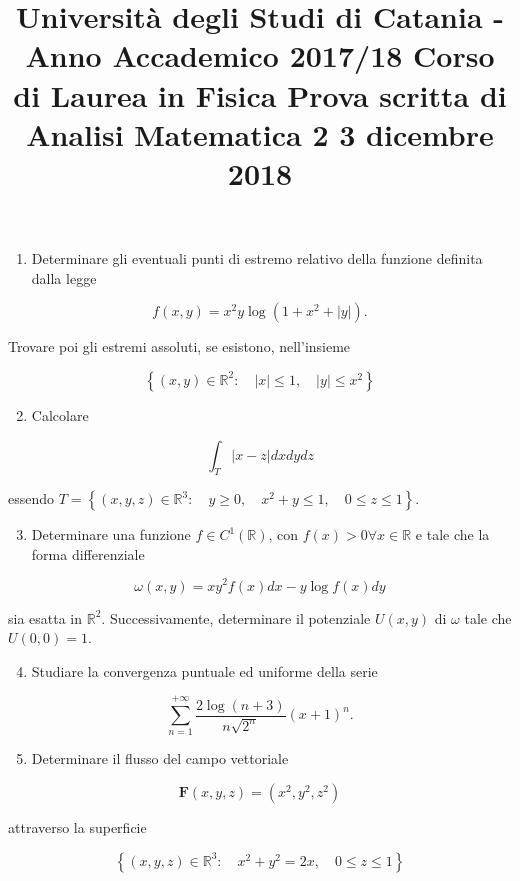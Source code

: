 \documentclass[10pt]{article}
\title{Università degli Studi di Catania - Anno Accademico 2017/18 
 Corso di Laurea in Fisica 
 Prova scritta di Analisi Matematica 2 
 3 dicembre 2018 }
\author{}
\date{}
\begin{document}
\maketitle
\begin{enumerate}
  \item Determinare gli eventuali punti di estremo relativo della funzione definita dalla legge
\end{enumerate}

\[
f(x, y)=x^{2} y \log \left(1+x^{2}+|y|\right) .
\]

Trovare poi gli estremi assoluti, se esistono, nell'insieme

\[
\left\{(x, y) \in \mathbb{R}^{2}: \quad|x| \leq 1, \quad|y| \leq x^{2}\right\}
\]

\begin{enumerate}
  \setcounter{enumi}{1}
  \item Calcolare
\end{enumerate}

\[
\int_{T}|x-z| d x d y d z
\]

essendo \(T=\left\{(x, y, z) \in \mathbb{R}^{3}: \quad y \geq 0, \quad x^{2}+y \leq 1, \quad 0 \leq z \leq 1\right\}\).

\begin{enumerate}
  \setcounter{enumi}{2}
  \item Determinare una funzione \(f \in C^{1}(\mathbb{R})\), con \(f(x)>0 \forall x \in \mathbb{R}\) e tale che la forma differenziale
\end{enumerate}

\[
\omega(x, y)=x y^{2} f(x) d x-y \log f(x) d y
\]

sia esatta in \(\mathbb{R}^{2}\). Successivamente, determinare il potenziale \(U(x, y)\) di \(\omega\) tale che \(U(0,0)=1\).

\begin{enumerate}
  \setcounter{enumi}{3}
  \item Studiare la convergenza puntuale ed uniforme della serie
\end{enumerate}

\[
\sum_{n=1}^{+\infty} \frac{2 \log (n+3)}{n \sqrt{2^{n}}}(x+1)^{n} .
\]

\begin{enumerate}
  \setcounter{enumi}{4}
  \item Determinare il flusso del campo vettoriale
\end{enumerate}

\[
\mathbf{F}(x, y, z)=\left(x^{2}, y^{2}, z^{2}\right)
\]

attraverso la superficie

\[
\left\{(x, y, z) \in \mathbb{R}^{3}: \quad x^{2}+y^{2}=2 x, \quad 0 \leq z \leq 1\right\}
\]
\end{document}
